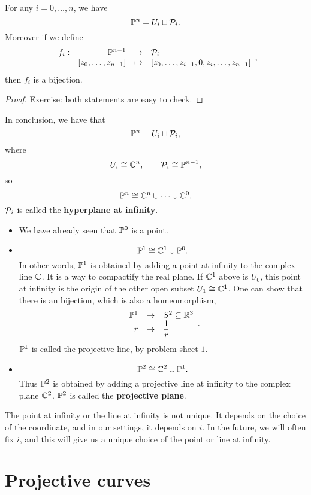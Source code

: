 \begin{lemma}
\label{lem:3.13}
For any $ i = 0, \dots, n $, we have
$$ \P^n = U_i \sqcup \PP_i. $$
Moreover if we define
$$ \function[f_i]{\P^{n - 1}}{\PP_i}{\sb{z_0, \dots, z_{n - 1}}}{\sb{z_0, \dots, z_{i - 1}, 0, z_i, \dots, z_{n - 1}}}, $$
then $ f_i $ is a bijection.
\end{lemma}

\begin{proof}
Exercise: both statements are easy to check.
\end{proof}

In conclusion, we have that
$$ \P^n = U_i \sqcup \PP_i, $$
where
$$ U_i \cong \C^n, \qquad \PP_i \cong \P^{n - 1}, $$
so
$$ \P^n \cong \C^n \cup \dots \cup \C^0. $$
$ \PP_i $ is called the \textbf{hyperplane at infinity}.

\begin{example}
\hfill
\begin{itemize}
\item We have already seen that $ \P^0 $ is a point.
\item
$$ \P^1 \cong \C^1 \cup \P^0. $$
In other words, $ \P^1 $ is obtained by adding a point at infinity to the complex line $ \C $. It is a way to compactify the real plane. If $ \C^1 $ above is $ U_0 $, this point at infinity is the origin of the other open subset $ U_1 \cong \C^1 $. One can show that there is an bijection, which is also a homeomorphism,
$$ \function{\P^1}{S^2 \subseteq \R^3}{r}{\dfrac{1}{r}}. $$
$ \P^1 $ is called the projective line, by problem sheet $ 1 $.
\item
$$ \P^2 \cong \C^2 \cup \P^1. $$
Thus $ \P^2 $ is obtained by adding a projective line at infinity to the complex plane $ \C^2 $. $ \P^2 $ is called the \textbf{projective plane}.
\end{itemize}
\end{example}

\begin{note*}
The point at infinity or the line at infinity is not unique. It depends on the choice of the coordinate, and in our settings, it depends on $ i $. In the future, we will often fix $ i $, and this will give us a unique choice of the point or line at infinity.
\end{note*}

\pagebreak

\section{Projective curves}

